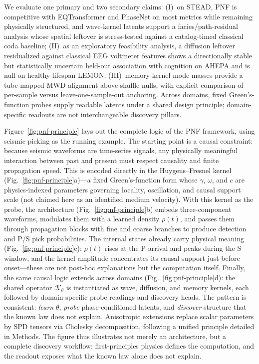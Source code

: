 \documentclass[twocolumn, 10pt]{article}
\newcommand{\pnf}{\textsc{PNF}}
\begin{document}
We evaluate one primary and two secondary claims: (I)~on STEAD, \pnf{} is competitive with EQTransformer and PhaseNet on most metrics while remaining physically structured, and wave-kernel latents support a facies/path-residual analysis whose spatial leftover is stress-tested against a catalog-timed classical coda baseline; (II)~as an exploratory feasibility analysis, a diffusion leftover residualized against classical EEG voltmeter features shows a directionally stable but statistically uncertain held-out association with cognition on AHEPA and is null on healthy-lifespan LEMON; (III)~memory-kernel mode masses provide a tube-mapped MWD alignment above shuffle nulls, with explicit comparison of per-sample versus leave-one-sample-out anchoring. Across domains, fixed Green's-function probes supply readable latents under a shared design principle; domain-specific readouts are not interchangeable discovery pillars.

Figure~\ref{fig:pnf-principle} lays out the complete logic of the PNF framework, using seismic picking as the running example. The starting point is a causal constraint: because seismic waveforms are time-series signals, any physically meaningful interaction between past and present must respect causality and finite propagation speed. This is encoded directly in the Huygens–Fresnel kernel (Fig.~\ref{fig:pnf-principle}a)—a fixed Green's-function form whose \(\gamma\), \(\omega\), and \(c\) are physics-indexed parameters governing locality, oscillation, and causal support scale (not claimed here as an identified medium velocity). With this kernel as the probe, the architecture (Fig.~\ref{fig:pnf-principle}b) embeds three-component waveforms, modulates them with a learned density \(\rho(t)\), and passes them through propagation blocks with fine and coarse branches to produce detection and P/S pick probabilities. The internal states already carry physical meaning (Fig.~\ref{fig:pnf-principle}c): \(\rho(t)\) rises at the P arrival and peaks during the S window, and the kernel amplitude concentrates its causal support just before onset—these are not post-hoc explanations but the computation itself. Finally, the same causal logic extends across domains (Fig.~\ref{fig:pnf-principle}d): the shared operator \(\mathcal{K}_\theta\) is instantiated as wave, diffusion, and memory kernels, each followed by domain-specific probe readings and discovery heads. The pattern is consistent: \emph{learn} \(\theta\), \emph{probe} phase-conditioned latents, and \emph{discover} structure that the known law does not explain. Anisotropic extensions replace scalar parameters by SPD tensors via Cholesky decomposition, following a unified principle detailed in Methods. The figure thus illustrates not merely an architecture, but a complete discovery workflow: first-principles physics defines the computation, and the readout exposes what the known law alone does not explain.
\end{document}
